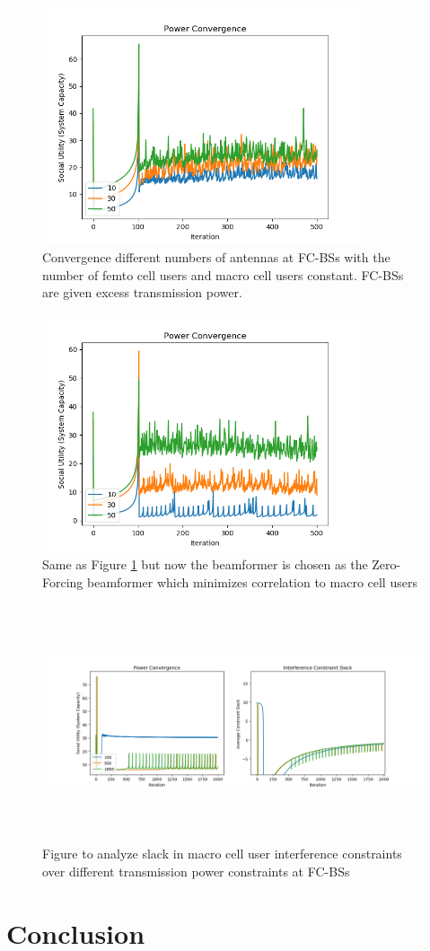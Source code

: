 \documentclass[12pt,a4paper]{report}
\begin{document}
\begin{figure}[H]
	  	\includegraphics[width=\textwidth,height = 7cm]{figures/increasing_antenna_game}
	  		  \caption{Convergence different numbers of antennas at FC-BSs with the number of femto cell users and macro cell users constant. FC-BSs are given excess transmission power.}
	  \label{fig:inc_ant}
\end{figure}

\begin{figure}[H]
	  	\includegraphics[width=\textwidth,height = 7cm]{figures/increasing_antenna_game_beamformer}
	  		  \caption{Same as Figure \ref{fig:inc_ant} but now the beamformer is chosen as the Zero-Forcing beamformer which minimizes correlation to macro cell users }
	  \label{fig:inc_fc}
\end{figure}


\begin{figure}[H]
	  	\includegraphics[width=\textwidth,height = 7cm]{figures/interference_debug}
	  		  \caption{Figure to analyze slack in macro cell user interference constraints over different transmission power constraints at FC-BSs}
	  \label{fig:inc_fc}
\end{figure}


\chapter{Conclusion}

\newpage

\end{document}
